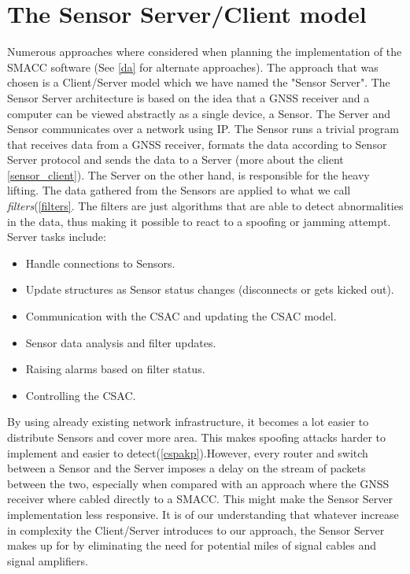 \documentclass[12pt,english,a4paper]{report}
\begin{document}
\section{The Sensor Server/Client model}
Numerous approaches where considered when planning the implementation of the SMACC software (See \ref{da} for alternate approaches). The approach that was chosen is a Client/Server model which we have named the "Sensor Server". The Sensor Server architecture is based on the idea that a GNSS receiver and a computer can be viewed abstractly as a single device, a Sensor. The Server and Sensor communicates over a network using IP. The Sensor runs a trivial program that receives data from a GNSS receiver, formats the data according to Sensor Server protocol and sends the data to a Server (more about the client \ref{sensor_client}). The Server on the other hand, is responsible for the heavy lifting. The data gathered from the Sensors are applied to what we call \textit{filters}(\ref{filters}. The filters are just algorithms that are able to detect abnormalities in the data, thus making it possible to react to a spoofing or jamming attempt. Server tasks include:
\begin{itemize}
  \item Handle connections to Sensors.
  \item Update structures as Sensor status changes (disconnects or gets kicked out).
  \item Communication with the CSAC and updating the CSAC model.
  \item Sensor data analysis and filter updates.
  \item Raising alarms based on filter status.
  \item Controlling the CSAC.
\end{itemize}
By using already existing network infrastructure, it becomes a lot easier to distribute Sensors and cover more area. This makes spoofing attacks harder to implement and easier to detect(\ref{cspakp}).However, every router and switch between a Sensor and the Server imposes a delay on the stream of packets between the two, especially when compared with an approach where the GNSS receiver where cabled directly to a SMACC. This might make the Sensor Server implementation less responsive. It is of our understanding that whatever increase in complexity the Client/Server introduces to our approach, the Sensor Server makes up for by eliminating the need for potential miles of signal cables and signal amplifiers. 
\end{document}
